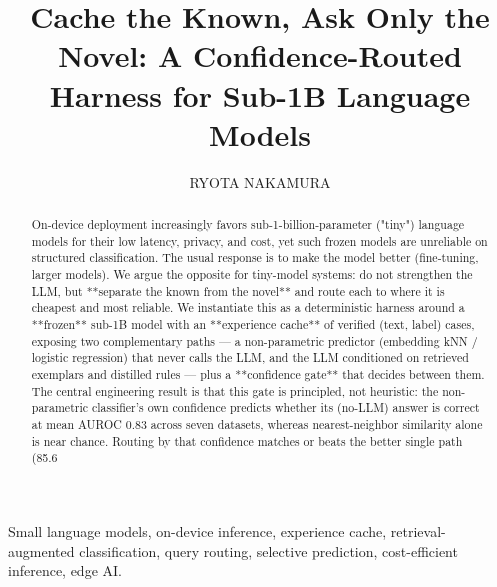 \documentclass{ieeeaccess}
\title{Cache the Known, Ask Only the Novel: A Confidence-Routed Harness for Sub-1B Language Models}
\author{\uppercase{Ryota Nakamura}\authorrefmark{1}}
\begin{document}
\maketitle

\begin{abstract}
On-device deployment increasingly favors sub-1-billion-parameter ("tiny") language models for their low latency, privacy, and cost, yet such frozen models are unreliable on structured classification. The usual response is to make the model better (fine-tuning, larger models). We argue the opposite for tiny-model systems: do not strengthen the LLM, but **separate the known from the novel** and route each to where it is cheapest and most reliable. We instantiate this as a deterministic harness around a **frozen** sub-1B model with an **experience cache** of verified (text, label) cases, exposing two complementary paths --- a non-parametric predictor (embedding kNN / logistic regression) that never calls the LLM, and the LLM conditioned on retrieved exemplars and distilled rules --- plus a **confidence gate** that decides between them. The central engineering result is that this gate is principled, not heuristic: the non-parametric classifier's own confidence predicts whether its (no-LLM) answer is correct at mean AUROC 0.83 across seven datasets, whereas nearest-neighbor similarity alone is near chance. Routing by that confidence matches or beats the better single path (85.6%
\end{abstract}

\begin{IEEEkeywords}
Small language models, on-device inference, experience cache, retrieval-augmented classification, query routing, selective prediction, cost-efficient inference, edge AI.
\end{IEEEkeywords}





\end{document}
